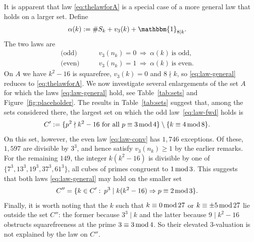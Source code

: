 \documentclass[12pt]{amsart}%
\renewcommand{\pmod}[1]{\hspace{0.05em}(\mathrm{mod}\,#1)}
\newcommand{\1}{\mathds{1}}
\renewcommand{\pmod}[1]{\,{\rm mod}\,#1}
\theoremstyle{definition}
\numberwithin{equation}{section}
\numberwithin{table}{section}
\numberwithin{figure}{section}
\begin{document}
It is apparent that law \eqref{eq:thelawforA} is a special case of a more general law that holds on a larger set. Define
\[
\alpha(k) := \#S_k + v_3(k) + \mathbbm{1}_{8 \mid k}.
\]
The two laws are
\begin{subequations}\label{eq:law-general}
\begin{align}
\text{(odd)}&\qquad v_3(n_k)=0 \ \Longrightarrow\ \alpha(k)\ \text{is odd},
   \label{eq:law-fwd}\\
\text{(even)}&\qquad v_3(n_k)=1 \ \Longrightarrow\ \alpha(k)\ \text{is even}.
   \label{eq:law-conv}
\end{align}
\end{subequations}
On $A$ we have $k^2-16$ is squarefree, $v_3(k) = 0$ and $8 \nmid k$, so \eqref{eq:law-general} reduces to \eqref{eq:thelawforA}. We now investigate several enlargements of the set $A$ for which the laws \eqref{eq:law-general} hold, see Table~\ref{tab:sets} and Figure~\ref{fig:placeholder}. The results in Table~\ref{tab:sets} suggest that, among the sets considered there, the largest set on which the  odd law~\eqref{eq:law-fwd} holds is
\[
C' := \{p^2 \nmid k^2 - 16 \text{ for all }p \equiv 3 \pmod 4 \} \setminus \{k \equiv 4 \pmod 8 \}.
\]
On this set, however, the even law \eqref{eq:law-conv} has $1{,}746$ exceptions. Of these, $1{,}597$ are divisible by $3^3$, and hence satisfy $v_3(n_k) \geq 1$ by the earlier remarks. For the remaining $149$, the integer $k(k^2-16)$ is divisible by one of $\{7^3, 13^3, 19^3, 37^3, 61^3 \}$, all cubes of primes congruent to $1 \pmod 3$. This suggests that both laws \eqref{eq:law-general} may hold on the smaller set
\[
C'' = \{k \in C' \, \colon\, p^3 \mid k(k^2-16) \Rightarrow p \equiv 2 \pmod 3 \}.
\]
Finally, it is worth noting that the $k$ such that $k \equiv 0 \pmod 27$ or $k \equiv \pm 5 \pmod 27$ lie outside the set $C''$:  the former because $3^3 \mid k$ and the latter because $9 \mid k^2-16$ obstructs squarefreeness at the prime  $3 \equiv 3 \pmod 4$. So their elevated $3$-valuation is not explained by the law on $C''$.
\end{document}
